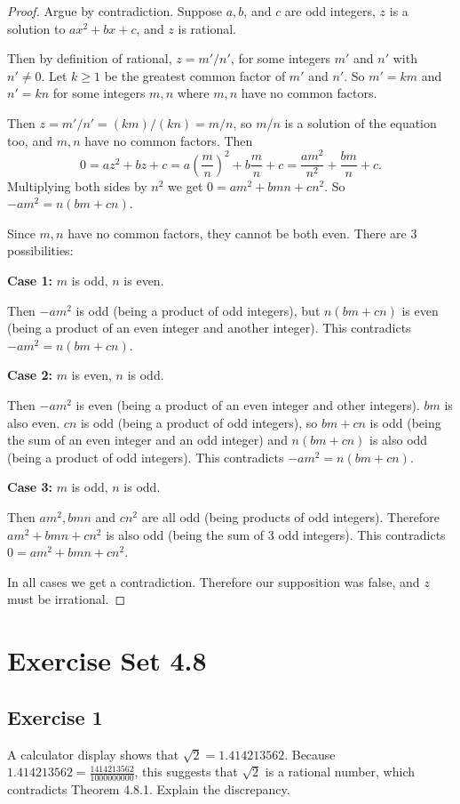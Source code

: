 \documentclass[14pt]{extarticle}
\begin{document}
\begin{proof}
Argue by contradiction. Suppose $a, b$, and $c$ are odd integers, $z$ is a solution to $ax^2 + bx + c$, and $z$ is rational. 

Then by definition of rational, $z = m'/n'$, for some integers $m'$ and $n'$ with $n' \neq 0$. Let $k \geq 1$ be the greatest common factor of $m'$ and $n'$. So $m'=km$ and $n'=kn$ for some integers $m,n$ where $m,n$ have no common factors.

Then $z = m'/n' = (km)/(kn) = m/n$, so $m/n$ is a solution of the equation too, and $m,n$ have no common factors. Then
\[
0 = az^2+bz+c = a\left(\frac{m}{n}\right)^2 + b\frac{m}{n} + c = \frac{am^2}{n^2} + \frac{bm}{n} + c.
\]
Multiplying both sides by $n^2$ we get $0 = am^2 + bmn + cn^2$. So $-am^2 = n(bm+cn)$.

Since $m,n$ have no common factors, they cannot be both even. There are 3 possibilities:

{\bf Case 1:} $m$ is odd, $n$ is even.

Then $-am^2$ is odd (being a product of odd integers), but $n(bm + cn)$ is even (being a product of an even integer and another integer). This contradicts $-am^2 = n(bm+cn)$.

{\bf Case 2:} $m$ is even, $n$ is odd.

Then $-am^2$ is even (being a product of an even integer and other integers). $bm$ is also even. $cn$ is odd (being a product of odd integers), so $bm+cn$ is odd (being the sum of an even integer and an odd integer) and $n(bm+cn)$ is also odd (being a product of odd integers). This contradicts $-am^2 = n(bm+cn)$.

{\bf Case 3:} $m$ is odd, $n$ is odd.

Then $am^2, bmn$ and $cn^2$ are all odd (being products of odd integers). Therefore  $am^2 + bmn + cn^2$ is also odd (being the sum of 3 odd integers). This contradicts $0 = am^2 + bmn + cn^2$.

In all cases we get a contradiction. Therefore our supposition was false, and $z$ must be irrational.
\end{proof}

\section{Exercise Set 4.8}

\subsection{Exercise 1}
A calculator display shows that $\sqrt{2} = 1.414213562$.
Because $1.414213562 = \frac{1414213562}{1000000000}$, this suggests that $\sqrt{2}$ is a rational number, which contradicts Theorem 4.8.1. Explain the discrepancy.
\end{document}
